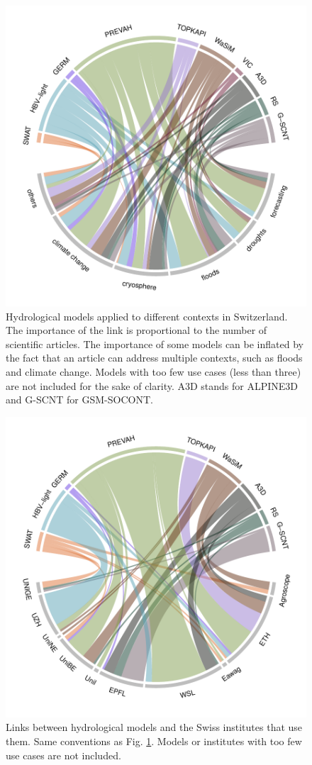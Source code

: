 \documentclass[10pt,a4paper]{article}
\begin{document}
\begin{figure}[htb]
	\begin{center}
		\includegraphics[width=0.70\columnwidth]{figures/chord_diagram_contexts}
		\caption{{Hydrological models applied to different contexts in Switzerland. The importance of the link is proportional to the number of scientific articles. The importance of some models can be inflated by the fact that an article can address multiple contexts, such as floods and climate change. Models with too few use cases (less than three) are not included for the sake of clarity. A3D stands for ALPINE3D and G-SCNT for GSM-SOCONT. 
		{\label{fig:applications}}
		}}
	\end{center}
\end{figure}

\begin{figure}[htb]
	\begin{center}
		\includegraphics[width=0.70\columnwidth]{figures/chord_diagram_institutes}
		\caption{{Links between hydrological models and the Swiss institutes that use them. Same conventions as Fig. \ref{fig:applications}. Models or institutes with too few use cases are not included.
		{\label{fig:model_institutes}}
		}}
	\end{center}
\end{figure}
\end{document}

